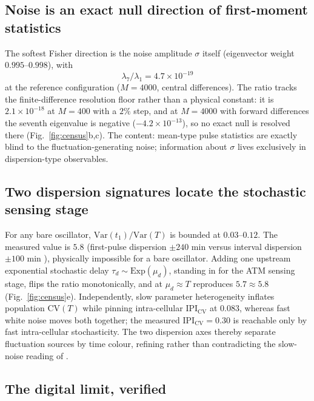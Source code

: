 \documentclass[11pt,a4paper]{article}
\begin{document}
\subsection{Noise is an exact null direction of first-moment statistics}

The softest Fisher direction is the noise amplitude $\sigma$ itself (eigenvector weight $0.995$--$0.998$), with
\begin{equation}
\lambda_7/\lambda_1=4.7\times10^{-19}
\label{eq:null}
\end{equation}
at the reference configuration ($M=4000$, central differences). The ratio tracks the finite-difference resolution floor rather than a physical constant: it is $2.1\times10^{-18}$ at $M=400$ with a $2\%$ step, and at $M=4000$ with forward differences the seventh eigenvalue is negative ($-4.2\times10^{-13}$), so no exact null is resolved there (Fig.~\ref{fig:census}b,c). The content: mean-type pulse statistics are exactly blind to the fluctuation-generating noise; information about $\sigma$ lives exclusively in dispersion-type observables.

\subsection{Two dispersion signatures locate the stochastic sensing stage}

For any bare oscillator, $\mathrm{Var}(t_1)/\mathrm{Var}(T)$ is bounded at $0.03$--$0.12$. The measured value is $5.8$ (first-pulse dispersion $\pm240$ min versus interval dispersion $\pm100$ min \cite{Lahav2004,GevaZatorsky2006}), physically impossible for a bare oscillator. Adding one upstream exponential stochastic delay $\tau_d\sim\mathrm{Exp}(\mu_d)$, standing in for the ATM sensing stage, flips the ratio monotonically, and at $\mu_d\approx T$ reproduces $5.7\approx5.8$ (Fig.~\ref{fig:census}e). Independently, slow parameter heterogeneity inflates population $\mathrm{CV}(T)$ while pinning intra-cellular $\mathrm{IPI}_{\mathrm{CV}}$ at $0.083$, whereas fast white noise moves both together; the measured $\mathrm{IPI}_{\mathrm{CV}}=0.30$ is reachable only by fast intra-cellular stochasticity. The two dispersion axes thereby separate fluctuation sources by time colour, refining rather than contradicting the slow-noise reading of \cite{GevaZatorsky2006}.

\subsection{The digital limit, verified}
\end{document}

